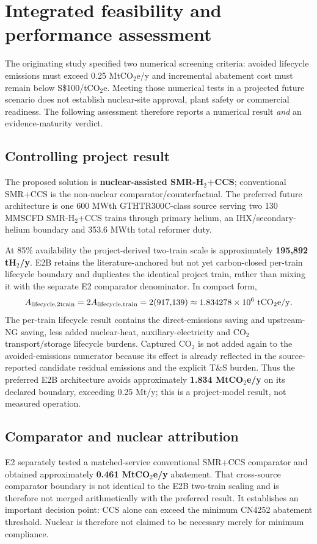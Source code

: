 \section{Integrated feasibility and performance assessment}\label{sec:cn4252-assessment}

The originating study specified two numerical screening criteria: avoided lifecycle emissions must exceed 0.25 MtCO$_2$e/y and incremental abatement cost must remain below S\$100/tCO$_2$e. Meeting those numerical tests in a projected future scenario does not establish nuclear-site approval, plant safety or commercial readiness. The following assessment therefore reports a numerical result \emph{and} an evidence-maturity verdict.

\subsection{Controlling project result}
The proposed solution is \textbf{nuclear-assisted SMR-H$_2$+CCS}; conventional SMR+CCS is the non-nuclear comparator/counterfactual. The preferred future architecture is one 600 MWth GTHTR300C-class source serving two 130 MMSCFD SMR-H$_2$+CCS trains through primary helium, an IHX/secondary-helium boundary and 353.6 MWth total reformer duty.

At 85\% availability the project-derived two-train scale is approximately \textbf{195,892 tH$_2$/y}. E2B retains the literature-anchored but not yet carbon-closed per-train lifecycle boundary and duplicates the identical project train, rather than mixing it with the separate E2 comparator denominator. In compact form,
\[
A_{\rm lifecycle,2train}
=2A_{\rm lifecycle,train}
=2(917{,}139)
\approx1.834278\times10^6~\mathrm{tCO_2e/y}.
\]
The per-train lifecycle result contains the direct-emissions saving and upstream-NG saving, less added nuclear-heat, auxiliary-electricity and CO$_2$ transport/storage lifecycle burdens. Captured CO$_2$ is not added again to the avoided-emissions numerator because its effect is already reflected in the source-reported candidate residual emissions and the explicit T\&S burden. Thus the preferred E2B architecture avoids approximately \textbf{1.834 MtCO$_2$e/y} on its declared boundary, exceeding 0.25 Mt/y; this is a project-model result, not measured operation.

\subsection{Comparator and nuclear attribution}
E2 separately tested a matched-service conventional SMR+CCS comparator and obtained approximately \textbf{0.461 MtCO$_2$e/y} abatement. That cross-source comparator boundary is not identical to the E2B two-train scaling and is therefore not merged arithmetically with the preferred result. It establishes an important decision point: CCS alone can exceed the minimum CN4252 abatement threshold. Nuclear is therefore not claimed to be necessary merely for minimum compliance.

